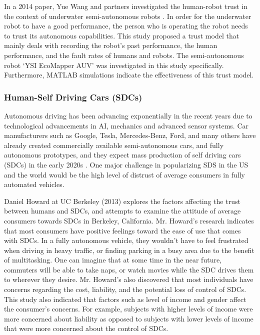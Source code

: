 \documentclass[runningheads,a4paper]{llncs}
\begin{document}
In a 2014 paper, Yue Wang and partners investigated the human-robot trust in the context of underwater semi-autonomous robots \cite{wang2014human}. In order for the underwater robot to have a good performance, the person who is operating the robot needs to trust its autonomous capabilities. This study proposed a trust model that mainly deals with recording the robot's past performance, the human performance, and the fault rates of humans and robots. The semi-autonomous robot `YSI EcoMapper AUV' was investigated in this study specifically. Furthermore, MATLAB simulations indicate the effectiveness of this trust model.

\subsubsection{Human-Self Driving Cars (SDCs)}
Autonomous driving has been advancing exponentially in the recent years due to technological advancements in AI, mechanics and advanced sensor systems. Car manufacturers such as Google, Tesla, Mercedes-Benz, Ford, and many others have already created commercially available semi-autonomous cars, and fully autonomous prototypes, and they expect mass production of self driving cars (SDCs) in the early 2020s \cite{driverlessFutureForcast}. One major challenge in popularizing SDS in the US and the world would be the high level of distrust of average consumers in fully automated vehicles.

Daniel Howard at UC Berkeley (2013) \cite{howard2014public} explores the factors affecting the trust between humans and SDCs, and attempts to examine the attitude of average consumers towards SDCs in Berkeley, California. Mr. Howard's research indicates that most consumers have positive feelings toward the ease of use that comes with SDCs. In a fully autonomous vehicle, they wouldn't have to feel frustrated when driving in heavy traffic, or finding parking in a busy area due to the benefit of multitasking. One can imagine that at some time in the near future, commuters will be able to take naps, or watch movies while the SDC drives them to wherever they desire. Mr. Howard's also discovered that most individuals have concerns regarding the cost, liability, and the potential loss of control of SDCs. This study also indicated that factors such as level of income and gender affect the consumer's concerns. For example, subjects with higher levels of income were more concerned about liability as opposed to subjects with lower levels of income that were more concerned about the control of SDCs.
\end{document}
